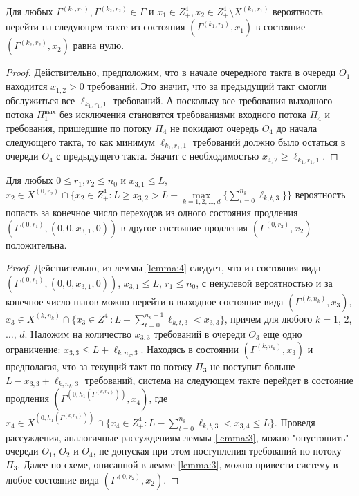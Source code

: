 \documentclass[a4paper,12pt,russian]{extarticle}
\newcommand{\G}{\Gamma}
\newcommand{\ga}[1]{\Gamma^{\left( #1 \right)} }
\begin{document}
\begin{lemma}
Для любых $\ga{k_1,r_1}, \ga{k_2,r_2} \in \G$ и $x_1 \in Z_+^4, x_2 \in Z_+^4 \setminus X^{(k_1,r_1)}$ вероятность перейти на следующем такте из состояния $(\ga{k_1,r_1},x_1)$ в состояние $(\ga{k_2,r_2}, x_2)$ равна нулю.
\label{lemma:5}
\end{lemma}
\begin{proof}
Действительно, предположим, что в начале очередного такта в очереди $O_1$ находится $x_{1,2} > 0$ требований. Это значит, что за предыдущий такт смогли обслужиться все $\ell_{k_1,r_1,1}$ требований. А поскольку все требования выходного потока $\Pi_1^{\mathrm{\text{вых}}}$ без исключения становятся требованиями входного потока $\Pi_4$ и требования, пришедшие по потоку $\Pi_4$ не покидают очередь $O_4$ до начала следующего такта, то как минимум $\ell_{k_1,r_1,1}$ требований должно было остаться в очереди $O_4$ с предыдущего такта. Значит с необходимостью $x_{4,2} \geqslant \ell_{k_1,r_1,1}$.
\end{proof}

\begin{lemma}
Для любых $0 \leqslant r_1, r_2 \leqslant n_0$ и $x_{3,1}\leqslant L$, $x_2 \in X^{(0,r_2)}\cap \{x_2 \in Z_+^4 \colon L \geqslant x_{3,2} > L - \max\limits_{k=1, 2, \ldots, d}\{\sum_{t=0}^{n_k} \ell_{k,t,3}\}\}$ вероятность попасть за конечное число переходов из одного состояния продления $(\ga{0,r_1},(0,0,x_{3,1},0))$ в другое состояние продления $(\ga{0,r_2},x_2)$ положительна.
\label{lemma:6}
\end{lemma}
\begin{proof}
Действительно, из леммы \eqref{lemma:4} следует, что из состояния вида $(\ga{0,r_1},(0,0,x_{3,1},0))$, $x_{3,1}\leqslant L$, $r_1 \leqslant n_0$, с ненулевой вероятностью и за конечное число шагов можно перейти в выходное состояние вида $(\ga{k,n_k},x_3)$, $x_3 \in X^{(k,n_k)}\cap \{x_3 \in Z_+^4 \colon   L - \sum_{t=0}^{n_k-1} \ell_{k,t,3} < x_{3,3}\}$, причем для любого $k=1$, $2$, $\ldots$, $d$. Наложим на количество $x_{3,3}$ требований в очереди $O_3$ еще одно ограничение: $x_{3,3} \leqslant L + \ell_{k,n_k,3}$. Находясь в состоянии $(\ga{k,n_k},x_3)$ и предполагая, что за текущий такт по потоку $\Pi_3$ не поступит больше $L - x_{3,3} + \ell_{k,n_k,3}$ требований, система на следующем такте перейдет в состояние продления $(\ga{0,h_1(\ga{k,n_k})}, x_4)$, где $x_4 \in X^{(0,h_1(\ga{k,n_k}))}\cap \{x_4 \in Z_+^4 \colon  L - \sum_{t=0}^{n_k} \ell_{k,t,3} < x_{3,4} \leqslant L\}$. Проведя рассуждения, аналогичные рассуждениям леммы \ref{lemma:3}, можно "опустошить" очереди $O_1$, $O_2$ и $O_4$, не допуская при этом поступления требований по потоку $\Pi_3$. Далее по схеме, описанной в лемме \ref{lemma:3}, можно привести систему в любое состояние вида $(\ga{0,r_2}, x_2)$.
\end{proof}
\end{document}
